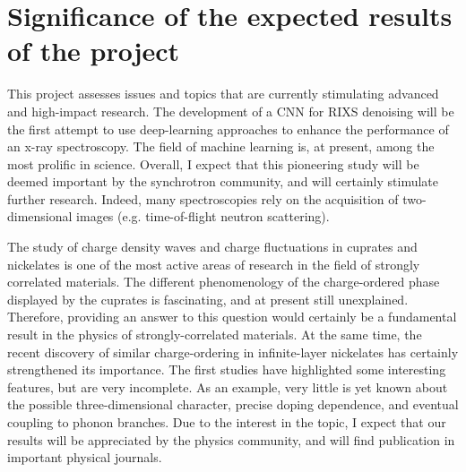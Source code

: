 \documentclass[a4paper, 12pt]{article}
\begin{document}
\section{Significance of the expected results of the project}
This project assesses issues and topics that are currently stimulating advanced and high-impact research. 
The development of a CNN for RIXS denoising will be the first attempt to use deep-learning approaches to enhance the performance of an x-ray spectroscopy. The field of machine learning is, at present, among the most prolific in science.
Overall, I expect that this pioneering study  will be deemed important by the synchrotron community, and will certainly stimulate further research. Indeed, many spectroscopies rely on the acquisition of two-dimensional images (e.g. time-of-flight neutron scattering). 

The study of charge density waves and charge fluctuations in cuprates and nickelates is one of the most active areas of research in the field of strongly correlated materials. The different phenomenology of the charge-ordered phase displayed by the cuprates is fascinating, and at present still unexplained. Therefore, providing an answer to this question would certainly be a fundamental result in the physics of strongly-correlated materials. 
At the same time, the recent discovery of similar charge-ordering in infinite-layer nickelates has certainly strengthened its importance. The first studies have highlighted some interesting features, but are very incomplete. As an example, very little is yet known about the possible three-dimensional character, precise doping dependence, and eventual coupling to phonon branches. Due to the interest in the topic, I expect that our results will be appreciated by the physics community, and will find publication in important physical journals.

\medskip 
\end{document}
